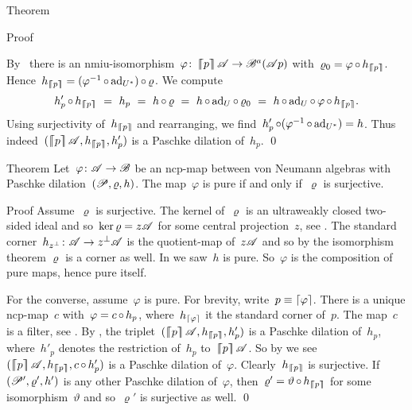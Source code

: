 \documentclass[b]{subfiles}
\begin{document}
\begin{parsec}
\begin{point}{Theorem}
\begin{point}{Proof}
\begin{point}
    By~
    there is an nmiu-isomorphism~$\varphi\colon
    \left\lceil\!\!\left\lceil p\right\rceil\!\!\right\rceil \mathscr{A} \to \mathscr{B}^a(\mathscr{A} p)$
    with~$\varrho_0 = \varphi \mathop{\circ} h_{\left\lceil\!\!\left\lceil p\right\rceil\!\!\right\rceil}$.
Hence~$h_{\left\lceil\!\!\left\lceil p\right\rceil\!\!\right\rceil} = (\varphi^{-1} \mathop{\circ} \mathrm{ad}_{U^*}) \mathop{\circ} \varrho$.
We compute
\begin{equation*}
h'_p \after h_{\cceil{p}}
    \ = \ h_p
    \ =\  h \after \varrho
    \ =\ h \after \ad_U \after \varrho_0
    \ = \ h \after \ad_U \after \varphi \after h_{\cceil{p}}.
\end{equation*}
Using surjectivity of~$h_{\left\lceil\!\!\left\lceil p\right\rceil\!\!\right\rceil}$
and rearranging, we find~$h'_p \mathop{\circ} (\varphi^{-1} \mathop{\circ} \mathrm{ad}_{U^*}) = h$.
Thus indeed~$(\cceil{p} \scrA, h_{\cceil{p}}, h'_p)$
is a Paschke dilation of~$h_p$.  \qed
\end{point}
\end{point}
\end{point}
\begin{point}{Theorem}%
    Let~$\varphi\colon \mathscr{A} \to \mathscr{B}$ be an ncp-map
    between von Neumann algebras with
    Paschke dilation~$(\mathscr{P}, \varrho, h)$.
The map~$\varphi$ is pure if and only if~$\varrho$ is surjective.
\begin{point}{Proof}%
Assume~$\varrho$ is surjective.
The kernel of~$\varrho$ is an ultraweakly closed
two-sided ideal and so~$\ker\varrho = z \mathscr{A}$ for some central projection~$z$,
see .
The standard corner~$h_{z^\perp} \colon \mathscr{A} \to z^\perp \mathscr{A}$
    is the quotient-map of~$z \mathscr{A}$
    and so by the isomorphism theorem $\varrho$ is a corner as well.
In  we saw~$h$ is pure.
So~$\varphi$ is the composition of pure maps, hence pure itself.

For the converse, assume~$\varphi$ is pure.
For brevity, write~$p \equiv \left\lceil\varphi\right\rceil$.
There is a unique ncp-map~$c$ with~$\varphi = c \mathop{\circ} h_p$,
    where~$h_{\left\lceil\varphi\right\rceil}$ it the standard corner of~$p$.
The map~$c$ is a filter,
    see .
By ,
    the triplet~$(\cceil{p}\scrA, h_{\cceil{p}}, h'_p)$
    is a Paschke dilation of~$h_p$,
    where~$h'_p$ denotes the restriction of~$h_p$ to~$\left\lceil\!\!\left\lceil p\right\rceil\!\!\right\rceil \mathscr{A}$.
So by 
    we see~$(\cceil{p}\scrA, h_{\cceil{p}}, c\after h'_p)$
    is a Paschke dilation of~$ \varphi$.
Clearly~$h_{\left\lceil\!\!\left\lceil p\right\rceil\!\!\right\rceil}$ is surjective.
If~$(\mathscr{P}', \varrho', h')$ is any other Paschke dilation of~$\varphi$,
    then~$\varrho' = \vartheta \mathop{\circ} h_{\left\lceil\!\!\left\lceil p\right\rceil\!\!\right\rceil}$
    for some isomorphism~$\vartheta$
    and so~$\varrho'$ is surjective as well. \qed
\end{point}
\end{point}
\end{parsec}
\end{document}
